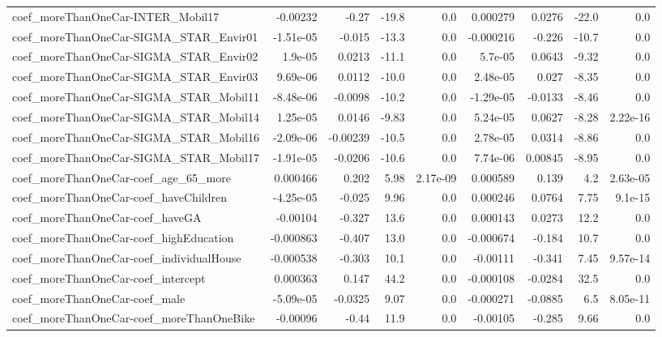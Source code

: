 \begin{tabular}{lrrrrrrrr}
coef\_moreThanOneCar-INTER\_Mobil17         &    -0.00232 &        -0.27 &   -19.8 &      0.0 &   0.000279 &      0.0276 &        -22.0 &           0.0 \\
coef\_moreThanOneCar-SIGMA\_STAR\_Envir01    &   -1.51e-05 &       -0.015 &   -13.3 &      0.0 &  -0.000216 &      -0.226 &        -10.7 &           0.0 \\
coef\_moreThanOneCar-SIGMA\_STAR\_Envir02    &     1.9e-05 &       0.0213 &   -11.1 &      0.0 &    5.7e-05 &      0.0643 &        -9.32 &           0.0 \\
coef\_moreThanOneCar-SIGMA\_STAR\_Envir03    &    9.69e-06 &       0.0112 &   -10.0 &      0.0 &   2.48e-05 &       0.027 &        -8.35 &           0.0 \\
coef\_moreThanOneCar-SIGMA\_STAR\_Mobil11    &   -8.48e-06 &      -0.0098 &   -10.2 &      0.0 &  -1.29e-05 &     -0.0133 &        -8.46 &           0.0 \\
coef\_moreThanOneCar-SIGMA\_STAR\_Mobil14    &    1.25e-05 &       0.0146 &   -9.83 &      0.0 &   5.24e-05 &      0.0627 &        -8.28 &      2.22e-16 \\
coef\_moreThanOneCar-SIGMA\_STAR\_Mobil16    &   -2.09e-06 &     -0.00239 &   -10.5 &      0.0 &   2.78e-05 &      0.0314 &        -8.86 &           0.0 \\
coef\_moreThanOneCar-SIGMA\_STAR\_Mobil17    &   -1.91e-05 &      -0.0206 &   -10.6 &      0.0 &   7.74e-06 &     0.00845 &        -8.95 &           0.0 \\
coef\_moreThanOneCar-coef\_age\_65\_more      &    0.000466 &        0.202 &    5.98 & 2.17e-09 &   0.000589 &       0.139 &          4.2 &      2.63e-05 \\
coef\_moreThanOneCar-coef\_haveChildren     &   -4.25e-05 &       -0.025 &    9.96 &      0.0 &   0.000246 &      0.0764 &         7.75 &       9.1e-15 \\
coef\_moreThanOneCar-coef\_haveGA           &    -0.00104 &       -0.327 &    13.6 &      0.0 &   0.000143 &      0.0273 &         12.2 &           0.0 \\
coef\_moreThanOneCar-coef\_highEducation    &   -0.000863 &       -0.407 &    13.0 &      0.0 &  -0.000674 &      -0.184 &         10.7 &           0.0 \\
coef\_moreThanOneCar-coef\_individualHouse  &   -0.000538 &       -0.303 &    10.1 &      0.0 &   -0.00111 &      -0.341 &         7.45 &      9.57e-14 \\
coef\_moreThanOneCar-coef\_intercept        &    0.000363 &        0.147 &    44.2 &      0.0 &  -0.000108 &     -0.0284 &         32.5 &           0.0 \\
coef\_moreThanOneCar-coef\_male             &   -5.09e-05 &      -0.0325 &    9.07 &      0.0 &  -0.000271 &     -0.0885 &          6.5 &      8.05e-11 \\
coef\_moreThanOneCar-coef\_moreThanOneBike  &    -0.00096 &        -0.44 &    11.9 &      0.0 &   -0.00105 &      -0.285 &         9.66 &           0.0 \\
\bottomrule
\end{tabular}

